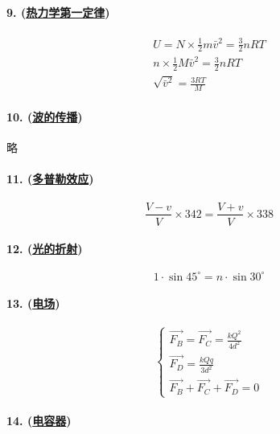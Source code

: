 \paragraph{9. (\hyperref[subsec:热力学第一定律]{热力学第一定律})}

\begin{gather*}
    U=N\times\frac12m\bar{v}^2=\frac32nRT\\
    n\times\frac12M\bar{v}^2=\frac32nRT\\
    \sqrt{\bar{v}^2}=\frac{3RT}{M}
\end{gather*}

\paragraph{10. (\hyperref[subsec:波的传播]{波的传播})} 略
\paragraph{11. (\hyperref[subsec:多普勒效应]{多普勒效应})}

\begin{equation*}
    \frac{V-v}{V}\times342=\frac{V+v}{V}\times338
\end{equation*}

\paragraph{12. (\hyperref[subsec:光的折射]{光的折射})}

\begin{equation*}
    1\cdot\sin45^\circ=n\cdot\sin30^\circ
\end{equation*}

\paragraph{13. (\hyperref[subsec:电场]{电场})}

\begin{equation*}
    \begin{cases}
        \vec{F_B}=\vec{F_C}=\frac{kQ^2}{4d^2}\\
        \vec{F_D}=\frac{kQq}{3d^2}\\
        \vec{F_B}+\vec{F_C}+\vec{F_D}=0
    \end{cases}
\end{equation*}

\paragraph{14. (\hyperref[subsec:电容器]{电容器})}

